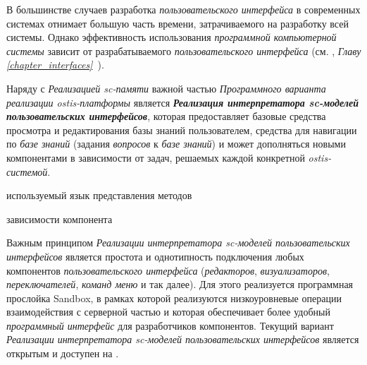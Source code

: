 В большинстве случаев разработка \textit{пользовательского интерфейса} в современных системах отнимает большую часть времени, затрачиваемого на разработку всей системы. Однако эффективность использования \textit{программной компьютерной системы} зависит от разрабатываемого \textit{пользовательского интерфейса} (см. , \textit{Главу \ref{chapter_interfaces}~}).

Наряду с \textit{Реализацией sc-памяти} важной частью \textit{Программного варианта реализации ostis-платформы} является \textbf{\textit{Реализация интерпретатора sc-моделей пользовательских интерфейсов}}, которая предоставляет базовые средства просмотра и редактирования базы знаний пользователем, средства для навигации по \textit{базе знаний} (задания \textit{вопросов} к \textit{базе знаний}) и может дополняться новыми компонентами в зависимости от задач, решаемых каждой конкретной \textit{ostis-системой}.

\begin{SCn}
\begin{scnrelfromlist}{используемый язык представления методов}
\end{scnrelfromlist}
\begin{scnrelfromset}{зависимости компонента}
\end{scnrelfromset}
\end{SCn}

Важным принципом \textit{Реализации интерпретатора sc-моделей пользовательских интерфейсов} является простота и однотипность подключения любых компонентов \textit{пользовательского интерфейса} (\textit{редакторов}, \textit{визуализаторов}, \textit{переключателей}, \textit{команд меню} и так далее). Для этого реализуется программная прослойка Sandbox, в рамках которой реализуются низкоуровневые операции взаимодействия с серверной частью и которая обеспечивает более удобный \textit{программный интерфейс} для разработчиков компонентов. Текущий вариант \textit{Реализации интерпретатора sc-моделей пользовательских интерфейсов} является открытым и доступен на .

